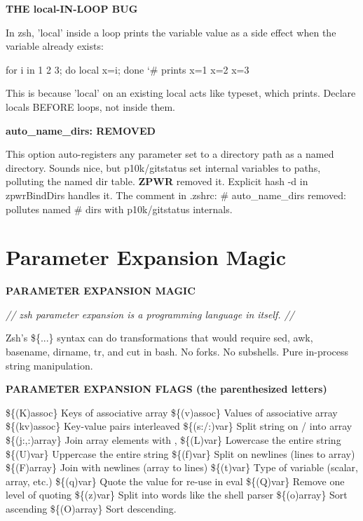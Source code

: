 \documentclass[11pt,a4paper,twoside]{book}
\begin{document}
\vspace{12pt}
{\bfseries\color{neonyellow} THE local-IN-LOOP BUG}\vspace{4pt}

In zsh, 'local' inside a loop prints the variable value as a side effect when the variable already exists:

\begin{codebox}
\color{neongreen}for i in 1 2 3; do local x=i; done  {\char`\#} prints x=1 x=2 x=3\\
\end{codebox}

This is because 'local' on an existing local acts like typeset, which prints. Declare locals BEFORE loops, not inside them.


\vspace{12pt}
{\bfseries\color{neonyellow} auto\_name\_dirs: REMOVED}\vspace{4pt}

This option auto-registers any parameter set to a directory path as a named directory. Sounds nice, but p10k/gitstatus set internal variables to paths, polluting the named dir table. \textbf{ZPWR} removed it. Explicit hash -d in zpwrBindDirs handles it. The comment in .zshrc: \# auto\_name\_dirs removed: pollutes named \# dirs with p10k/gitstatus internals.


\vspace{16pt}

\section{Parameter Expansion Magic}


\vspace{10pt}
{\large\bfseries\color{neoncyan} PARAMETER EXPANSION MAGIC}\vspace{6pt}

{\small\itshape\color{dimtext} // zsh parameter expansion is a programming language in itself. //}

Zsh's \$\{...\} syntax can do transformations that would require sed, awk, basename, dirname, tr, and cut in bash. No forks. No subshells. Pure in-process string manipulation.


\vspace{12pt}
{\bfseries\color{neonyellow} PARAMETER EXPANSION FLAGS (the parenthesized letters)}\vspace{4pt}

\$\{(K)assoc\}          Keys of associative array \$\{(v)assoc\}          Values of associative array \$\{(kv)assoc\}         Key-value pairs interleaved \$\{(s:/:)var\}         Split string on / into array \$\{(j:,:)array\}       Join array elements with , \$\{(L)var\}            Lowercase the entire string \$\{(U)var\}            Uppercase the entire string \$\{(f)var\}            Split on newlines (lines to array) \$\{(F)array\}          Join with newlines (array to lines) \$\{(t)var\}            Type of variable (scalar, array, etc.) \$\{(q)var\}            Quote the value for re-use in eval \$\{(Q)var\}            Remove one level of quoting \$\{(z)var\}            Split into words like the shell parser \$\{(o)array\}          Sort ascending \$\{(O)array\}          Sort descending.
\end{document}
